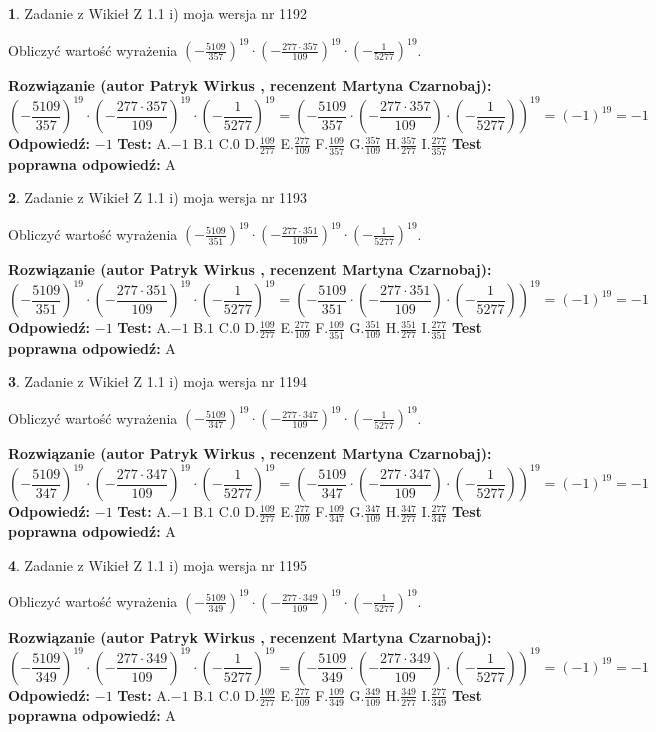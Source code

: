 \documentclass[12pt, a4paper]{article}
\theoremstyle{definition} %
\newtheorem{zad}{}
\newcommand{\zadStart}[1]{\begin{zad}#1\newline}
\newcommand{\zadStop}{\end{zad}}
\newcommand{\rozwStart}[2]{\noindent \textbf{Rozwiązanie (autor #1 , recenzent #2): }\newline}
\newcommand{\rozwStop}{\newline}
\newcommand{\odpStart}{\noindent \textbf{Odpowiedź:}\newline}
\newcommand{\odpStop}{\newline}
\newcommand{\testStart}{\noindent \textbf{Test:}\newline}
\newcommand{\testStop}{\newline}
\newcommand{\kluczStart}{\noindent \textbf{Test poprawna odpowiedź:}\newline}
\newcommand{\kluczStop}{\newline}
\begin{document}
\zadStart{Zadanie z Wikieł Z 1.1 i) moja wersja nr 1192}

Obliczyć wartość wyrażenia $(-\frac{5109}{357})^{19} \cdot (-\frac{277 \cdot 357}{109})^{19} \cdot (-\frac{1}{5277})^{19}$.
\zadStop
\rozwStart{Patryk Wirkus}{Martyna Czarnobaj}
$$(-\frac{5109}{357})^{19} \cdot (-\frac{277 \cdot 357}{109})^{19} \cdot (-\frac{1}{5277})^{19} = (-\frac{5109}{357} \cdot (-\frac{277 \cdot 357}{109}) \cdot (-\frac{1}{5277}))^{19} = (-1)^{19} = -1$$
\rozwStop
\odpStart
$-1$
\odpStop
\testStart
A.$-1$ B.$1$ C.$0$ D.$\frac{109}{277}$ E.$\frac{277}{109}$
F.$\frac{109}{357}$ G.$\frac{357}{109}$
H.$\frac{357}{277}$
I.$\frac{277}{357}$
\testStop
\kluczStart
A
\kluczStop



\zadStart{Zadanie z Wikieł Z 1.1 i) moja wersja nr 1193}

Obliczyć wartość wyrażenia $(-\frac{5109}{351})^{19} \cdot (-\frac{277 \cdot 351}{109})^{19} \cdot (-\frac{1}{5277})^{19}$.
\zadStop
\rozwStart{Patryk Wirkus}{Martyna Czarnobaj}
$$(-\frac{5109}{351})^{19} \cdot (-\frac{277 \cdot 351}{109})^{19} \cdot (-\frac{1}{5277})^{19} = (-\frac{5109}{351} \cdot (-\frac{277 \cdot 351}{109}) \cdot (-\frac{1}{5277}))^{19} = (-1)^{19} = -1$$
\rozwStop
\odpStart
$-1$
\odpStop
\testStart
A.$-1$ B.$1$ C.$0$ D.$\frac{109}{277}$ E.$\frac{277}{109}$
F.$\frac{109}{351}$ G.$\frac{351}{109}$
H.$\frac{351}{277}$
I.$\frac{277}{351}$
\testStop
\kluczStart
A
\kluczStop



\zadStart{Zadanie z Wikieł Z 1.1 i) moja wersja nr 1194}

Obliczyć wartość wyrażenia $(-\frac{5109}{347})^{19} \cdot (-\frac{277 \cdot 347}{109})^{19} \cdot (-\frac{1}{5277})^{19}$.
\zadStop
\rozwStart{Patryk Wirkus}{Martyna Czarnobaj}
$$(-\frac{5109}{347})^{19} \cdot (-\frac{277 \cdot 347}{109})^{19} \cdot (-\frac{1}{5277})^{19} = (-\frac{5109}{347} \cdot (-\frac{277 \cdot 347}{109}) \cdot (-\frac{1}{5277}))^{19} = (-1)^{19} = -1$$
\rozwStop
\odpStart
$-1$
\odpStop
\testStart
A.$-1$ B.$1$ C.$0$ D.$\frac{109}{277}$ E.$\frac{277}{109}$
F.$\frac{109}{347}$ G.$\frac{347}{109}$
H.$\frac{347}{277}$
I.$\frac{277}{347}$
\testStop
\kluczStart
A
\kluczStop



\zadStart{Zadanie z Wikieł Z 1.1 i) moja wersja nr 1195}

Obliczyć wartość wyrażenia $(-\frac{5109}{349})^{19} \cdot (-\frac{277 \cdot 349}{109})^{19} \cdot (-\frac{1}{5277})^{19}$.
\zadStop
\rozwStart{Patryk Wirkus}{Martyna Czarnobaj}
$$(-\frac{5109}{349})^{19} \cdot (-\frac{277 \cdot 349}{109})^{19} \cdot (-\frac{1}{5277})^{19} = (-\frac{5109}{349} \cdot (-\frac{277 \cdot 349}{109}) \cdot (-\frac{1}{5277}))^{19} = (-1)^{19} = -1$$
\rozwStop
\odpStart
$-1$
\odpStop
\testStart
A.$-1$ B.$1$ C.$0$ D.$\frac{109}{277}$ E.$\frac{277}{109}$
F.$\frac{109}{349}$ G.$\frac{349}{109}$
H.$\frac{349}{277}$
I.$\frac{277}{349}$
\testStop
\kluczStart
A
\kluczStop
\end{document}
